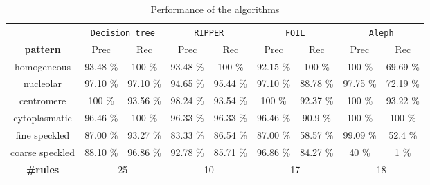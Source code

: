 \begin{table}
	\scriptsize
	\caption{Performance of the algorithms}
	\label{tab:Perf}
	\begin{tabular}{c|c|c||c|c||c|c||c|c|}
		& \multicolumn{2}{c}{\texttt{Decision tree}} & \multicolumn{2}{c}{\texttt{RIPPER}} & \multicolumn{2}{c}{\texttt{FOIL}} & \multicolumn{2}{c}{\texttt{Aleph}} \\
		\textbf{pattern} & Prec & Rec & Prec & Rec & Prec & Rec & Prec & Rec \\
		\hline \hline
		homogeneous & 93.48 \% & 100 \% & 93.48 \% & 100 \% & 92.15 \% & 100 \% & 100 \% & 69.69 \% \\
		nucleolar & 97.10 \% & 97.10 \% & 94.65 \% & 95.44 \% & 97.10 \% & 88.78 \% & 97.75 \% & 72.19 \%\\
		centromere & 100 \% & 93.56 \% & 98.24 \% & 93.54 \% & 100 \% & 92.37 \% & 100 \% & 93.22 \%\\
		cytoplasmatic & 96.46 \% & 100 \% & 96.33 \% & 96.33 \% & 96.46 \% & 90.9 \% & 100 \% & 100 \% \\
		fine speckled & 87.00 \% & 93.27 \% & 83.33 \% & 86.54 \% & 87.00 \% & 58.57 \% & 99.09 \% & 52.4 \%\\
		coarse speckled & 88.10 \% & 96.86 \% & 92.78 \% & 85.71 \% & 96.86 \% & 84.27 \% & 40 \% & 1 \%\\
		\hline \hline
		\textbf{\#rules} & \multicolumn{2}{c}{25} & \multicolumn{2}{c}{10} & \multicolumn{2}{c}{17} & \multicolumn{2}{c}{18}
	\end{tabular}
\end{table}





